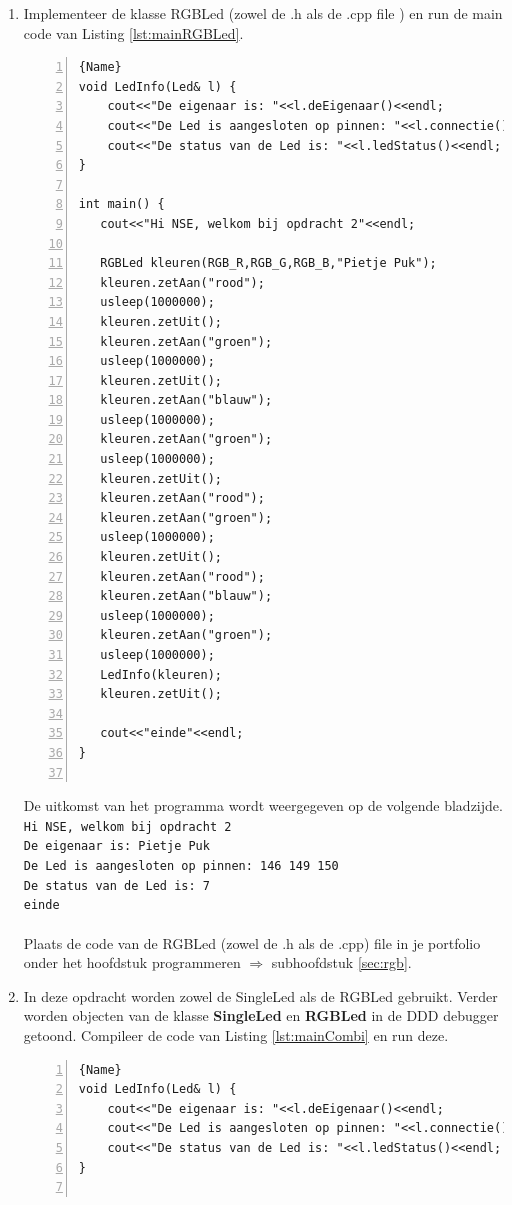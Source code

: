 \begin{enumerate}[label=(\alph*)]
	\item
	Implementeer de klasse RGBLed (zowel de .h als de .cpp file ) en run de main code van Listing \ref{lst:mainRGBLed}.
	
\begin{lstlisting}[caption=main functie om de klasse SingleLed te testen. ,frame=trbl,firstnumber=1,numbers=left,label={lst:mainRGBLed}]{Name}
void LedInfo(Led& l) {
	cout<<"De eigenaar is: "<<l.deEigenaar()<<endl;
	cout<<"De Led is aangesloten op pinnen: "<<l.connectie()<<endl;
	cout<<"De status van de Led is: "<<l.ledStatus()<<endl;
}
		
int main() {
   cout<<"Hi NSE, welkom bij opdracht 2"<<endl;

   RGBLed kleuren(RGB_R,RGB_G,RGB_B,"Pietje Puk");
   kleuren.zetAan("rood");
   usleep(1000000);
   kleuren.zetUit();
   kleuren.zetAan("groen");
   usleep(1000000);
   kleuren.zetUit();
   kleuren.zetAan("blauw");
   usleep(1000000);
   kleuren.zetAan("groen");
   usleep(1000000);
   kleuren.zetUit();
   kleuren.zetAan("rood");
   kleuren.zetAan("groen");
   usleep(1000000);
   kleuren.zetUit();
   kleuren.zetAan("rood");
   kleuren.zetAan("blauw");
   usleep(1000000);
   kleuren.zetAan("groen");
   usleep(1000000);
   LedInfo(kleuren);  
   kleuren.zetUit();

   cout<<"einde"<<endl;
}
		
\end{lstlisting}
 De uitkomst van het programma wordt weergegeven op de volgende bladzijde.
 \newpage
\texttt{Hi NSE, welkom bij opdracht 2\\
De eigenaar is: Pietje Puk\\
De Led is aangesloten op pinnen: 146 149 150\\
De status van de Led is: 7\\
einde\\ \\    
}
Plaats de code van de RGBLed (zowel de .h als de .cpp) file in je portfolio onder het hoofdstuk programmeren $\Longrightarrow$ subhoofdstuk \ref{sec:rgb}.

\item In deze opdracht worden zowel de SingleLed als de RGBLed gebruikt. Verder worden objecten van de klasse \textbf{SingleLed} en \textbf{RGBLed} in de DDD debugger getoond. Compileer de code van Listing \ref{lst:mainCombi} en run deze.
\begin{lstlisting}[caption=main functie om de klasse SingleLed te testen. ,frame=trbl,firstnumber=1,numbers=left,label={lst:mainCombi}]{Name}
void LedInfo(Led& l) {
	cout<<"De eigenaar is: "<<l.deEigenaar()<<endl;
	cout<<"De Led is aangesloten op pinnen: "<<l.connectie()<<endl;
	cout<<"De status van de Led is: "<<l.ledStatus()<<endl;
}


\end{lstlisting}
\end{enumerate}
